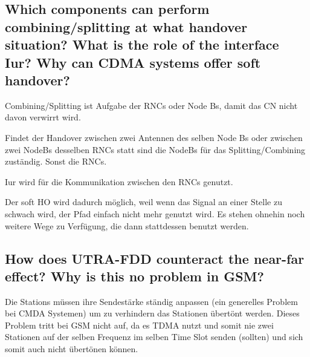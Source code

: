 \subsection{Which components can perform combining/splitting at what handover situation? What is the role of the interface Iur? Why can CDMA systems offer soft handover?}
Combining/Splitting ist Aufgabe der RNCs oder Node Bs, damit das CN nicht davon verwirrt wird.

Findet der Handover zwischen zwei Antennen des selben Node Bs oder zwischen zwei NodeBs desselben RNCs statt sind die NodeBs für das Splitting/Combining zuständig. Sonst die RNCs.

Iur wird für die Kommunikation zwischen den RNCs genutzt.

Der soft HO wird dadurch möglich, weil wenn das Signal an einer Stelle zu schwach wird, der Pfad einfach nicht mehr genutzt wird. Es stehen ohnehin noch weitere Wege zu Verfügung, die dann stattdessen benutzt werden.
\subsection{How does UTRA-FDD counteract the near-far effect? Why is this no problem in GSM?}
Die Stations müssen ihre Sendestärke ständig anpassen (ein generelles Problem bei CMDA Systemen) um zu verhindern das Stationen übertönt werden. Dieses Problem tritt bei GSM nicht auf, da es TDMA nutzt und somit nie zwei Stationen auf der selben Frequenz im selben Time Slot senden (sollten) und sich somit auch nicht übertönen können.


